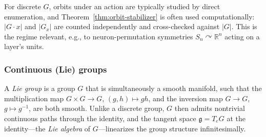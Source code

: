 \documentclass[mathematics,review,submit,moreauthors]{Definitions/mdpi}
\begin{document}
For discrete $G$, orbits under an action are typically studied by direct
enumeration, and Theorem~\ref{thm:orbit-stabilizer} is often used
computationally: $|G\cdot x|$ and $|G_x|$ are counted independently and
cross-checked against $|G|$. This is the regime relevant, e.g., to
neuron-permutation symmetries $S_n \curvearrowright \mathbb{R}^{n}$ acting on
a layer's units.

\subsubsection{Continuous (Lie) groups}
\label{subsubsec:lie-groups}

\begin{Definition}
\label{def:lie-group}
A \emph{Lie group} is a group $G$ that is simultaneously a smooth manifold,
such that the multiplication map $G \times G \to G$, $(g,h) \mapsto gh$, and
the inversion map $G \to G$, $g \mapsto g^{-1}$, are both smooth. Unlike a
discrete group, $G$ then admits nontrivial continuous paths through the
identity, and the tangent space $\mathfrak{g} = T_e G$ at the identity---the
\emph{Lie algebra} of $G$---linearizes the group structure infinitesimally.
\end{Definition}
\end{document}
